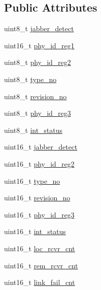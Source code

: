 \subsection*{Public Attributes}
\begin{DoxyCompactItemize}
\item 
uint8\+\_\+t \mbox{\hyperlink{structdiagnostic_data_sh_m_ac2b66edcfd19f4d451164ac0db6311ba}{jabber\+\_\+detect}}
\item 
uint16\+\_\+t \mbox{\hyperlink{structdiagnostic_data_sh_m_a5412678306937d33f7ce540392dd3bee}{phy\+\_\+id\+\_\+reg1}}
\item 
uint8\+\_\+t \mbox{\hyperlink{structdiagnostic_data_sh_m_abb2c872d63a3cba2131ec247be6fd488}{phy\+\_\+id\+\_\+reg2}}
\item 
uint8\+\_\+t \mbox{\hyperlink{structdiagnostic_data_sh_m_abaf7cabbe086caa5a4633769892634b8}{type\+\_\+no}}
\item 
uint8\+\_\+t \mbox{\hyperlink{structdiagnostic_data_sh_m_ab92c40adccff7a9ed25309f1ff536a31}{revision\+\_\+no}}
\item 
uint8\+\_\+t \mbox{\hyperlink{structdiagnostic_data_sh_m_ac3d2a208220c5b1783c611c335991838}{phy\+\_\+id\+\_\+reg3}}
\item 
uint8\+\_\+t \mbox{\hyperlink{structdiagnostic_data_sh_m_ab2ca00889c6139adfe8fa5b64cf6936d}{int\+\_\+status}}
\item 
uint16\+\_\+t \mbox{\hyperlink{structdiagnostic_data_sh_m_ac2b66edcfd19f4d451164ac0db6311ba}{jabber\+\_\+detect}}
\item 
uint16\+\_\+t \mbox{\hyperlink{structdiagnostic_data_sh_m_abb2c872d63a3cba2131ec247be6fd488}{phy\+\_\+id\+\_\+reg2}}
\item 
uint16\+\_\+t \mbox{\hyperlink{structdiagnostic_data_sh_m_abaf7cabbe086caa5a4633769892634b8}{type\+\_\+no}}
\item 
uint16\+\_\+t \mbox{\hyperlink{structdiagnostic_data_sh_m_ab92c40adccff7a9ed25309f1ff536a31}{revision\+\_\+no}}
\item 
uint16\+\_\+t \mbox{\hyperlink{structdiagnostic_data_sh_m_ac3d2a208220c5b1783c611c335991838}{phy\+\_\+id\+\_\+reg3}}
\item 
uint16\+\_\+t \mbox{\hyperlink{structdiagnostic_data_sh_m_ab2ca00889c6139adfe8fa5b64cf6936d}{int\+\_\+status}}
\item 
uint16\+\_\+t \mbox{\hyperlink{structdiagnostic_data_sh_m_ac0c9f1dc4e8f935100b4c9840a873f36}{loc\+\_\+rcvr\+\_\+cnt}}
\item 
uint16\+\_\+t \mbox{\hyperlink{structdiagnostic_data_sh_m_a3f0bf956d0452b349d1d51dcc67e8600}{rem\+\_\+rcvr\+\_\+cnt}}
\item 
uint16\+\_\+t \mbox{\hyperlink{structdiagnostic_data_sh_m_a0d3efa05bf7a22241d54e6e6e9fb3732}{link\+\_\+fail\+\_\+cnt}}
\end{DoxyCompactItemize}


